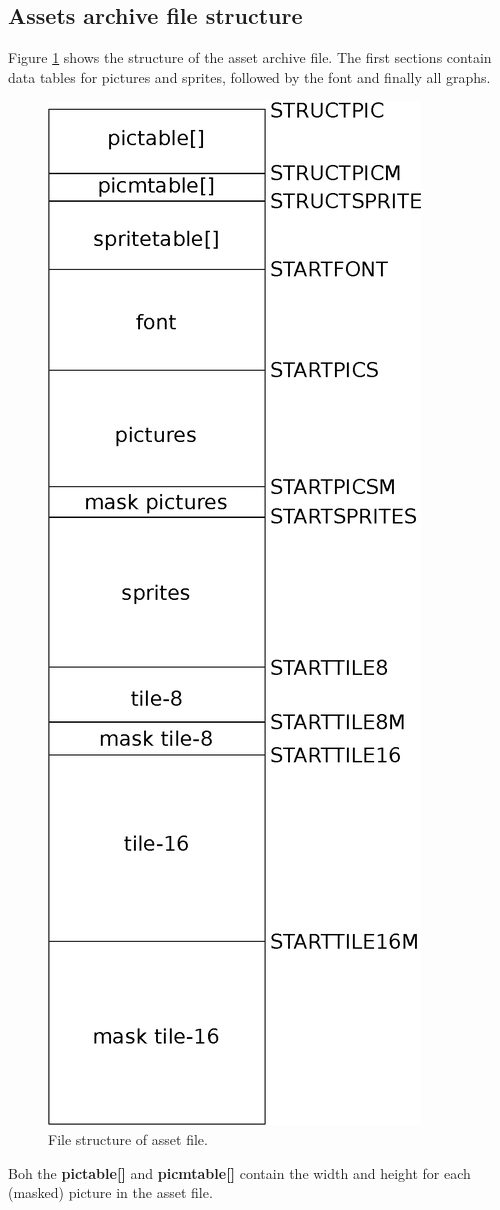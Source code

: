 \documentclass[book.tex]{subfiles}
\begin{document}
\subsection{Assets archive file structure}
\label{section:asset_file_structure}
Figure \ref{fig:asset-file} shows the structure of the  asset archive file. The first sections contain data tables for pictures and sprites, followed by the font and finally all graphs.\\
\begin{figure}[H]
\centering
 \includegraphics[width=.4\textwidth]{imgs/drawings/graphic_assets.eps}
 \caption{File structure of  asset file.}
 \label{fig:asset-file}
\end{figure}

Boh the \textbf{pictable[]} and \textbf{picmtable[]} contain the width and height for each (masked) picture in the asset file.\\
\end{document}
